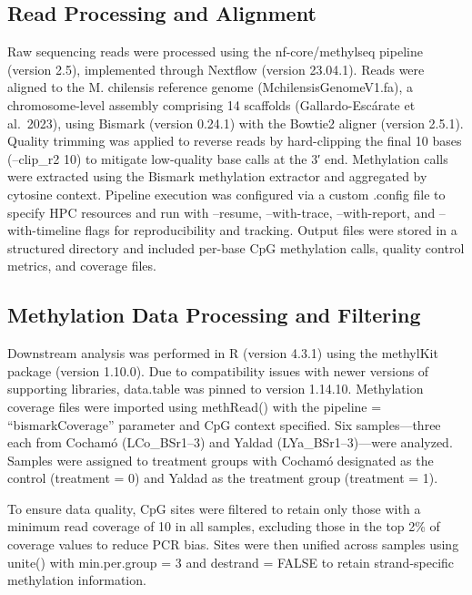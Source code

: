 \documentclass[
]{agujournal2019}
\begin{document}
\subsection{Read Processing and
Alignment}\label{read-processing-and-alignment}

Raw sequencing reads were processed using the nf-core/methylseq pipeline
(version 2.5), implemented through Nextflow (version 23.04.1). Reads
were aligned to the M. chilensis reference genome
(MchilensisGenomeV1.fa), a chromosome-level assembly comprising 14
scaffolds (Gallardo-Escárate et al.~2023), using Bismark (version
0.24.1) with the Bowtie2 aligner (version 2.5.1). Quality trimming was
applied to reverse reads by hard-clipping the final 10 bases (--clip\_r2
10) to mitigate low-quality base calls at the 3′ end. Methylation calls
were extracted using the Bismark methylation extractor and aggregated by
cytosine context. Pipeline execution was configured via a custom .config
file to specify HPC resources and run with --resume, --with-trace,
--with-report, and --with-timeline flags for reproducibility and
tracking. Output files were stored in a structured directory and
included per-base CpG methylation calls, quality control metrics, and
coverage files.

\subsection{Methylation Data Processing and
Filtering}\label{methylation-data-processing-and-filtering}

Downstream analysis was performed in R (version 4.3.1) using the
methylKit package (version 1.10.0). Due to compatibility issues with
newer versions of supporting libraries, data.table was pinned to version
1.14.10. Methylation coverage files were imported using methRead() with
the pipeline = ``bismarkCoverage'' parameter and CpG context specified.
Six samples---three each from Cochamó (LCo\_BSr1--3) and Yaldad
(LYa\_BSr1--3)---were analyzed. Samples were assigned to treatment
groups with Cochamó designated as the control (treatment = 0) and Yaldad
as the treatment group (treatment = 1).

To ensure data quality, CpG sites were filtered to retain only those
with a minimum read coverage of 10 in all samples, excluding those in
the top 2\% of coverage values to reduce PCR bias. Sites were then
unified across samples using unite() with min.per.group = 3 and destrand
= FALSE to retain strand-specific methylation information.
\end{document}
